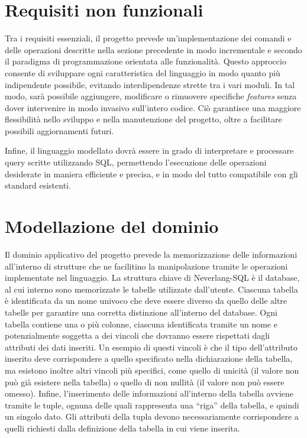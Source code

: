 \documentclass[12pt,a4paper,openright,twoside]{book}
\begin{document}


\section{Requisiti non funzionali}
Tra i requisiti essenziali, il progetto prevede un'implementazione dei comandi e delle operazioni descritte nella sezione precedente in 
modo incrementale e secondo il paradigma di programmazione orientata alle funzionalità. Questo approccio consente di sviluppare ogni 
caratteristica del linguaggio in modo quanto più indipendente possibile, evitando interdipendenze strette tra i vari moduli. In tal modo, 
sarà possibile aggiungere, modificare o rimuovere specifiche \textit{features} senza dover intervenire in modo invasivo sull’intero 
codice. Ciò garantisce una maggiore flessibilità nello sviluppo e nella manutenzione del progetto, oltre a facilitare possibili 
aggiornamenti futuri.

Infine, il linguaggio modellato dovrà essere in grado di interpretare e processare query scritte utilizzando \ac{SQL}, permettendo 
l’esecuzione delle operazioni desiderate in maniera efficiente e precisa, e in modo del tutto compatibile con gli standard esistenti.


\section{Modellazione del dominio}
Il dominio applicativo del progetto prevede la memorizzazione delle informazioni all’interno di strutture che ne facilitino la manipolazione 
tramite le operazioni implementate nel linguaggio. La struttura chiave di Neverlang-SQL è il database, al cui interno sono memorizzate le 
tabelle utilizzate dall’utente. Ciascuna tabella è identificata da un nome univoco che deve essere diverso da quello delle altre tabelle 
per garantire una corretta distinzione all’interno del database. Ogni tabella contiene una o più colonne, ciascuna identificata tramite un 
nome e potenzialmente soggetta a dei vincoli che dovranno essere rispettati dagli attributi dei dati inseriti. Un esempio di questi vincoli 
è che il tipo dell’attributo inserito deve corrispondere a quello specificato nella dichiarazione della tabella, ma esistono inoltre altri 
vincoli più specifici, come quello di unicità (il valore non può già esistere nella tabella) o quello di non nullità (il valore non può 
essere omesso). Infine, l’inserimento delle informazioni all’interno della tabella avviene tramite le tuple, ognuna delle quali rappresenta 
una ``riga'' della tabella, e quindi un singolo dato. Gli attributi della tupla devono necessariamente corrispondere a quelli richiesti 
dalla definizione della tabella in cui viene inserita.
\end{document}
